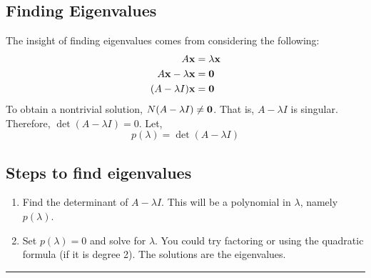 \subsection{Finding Eigenvalues}
The insight of finding eigenvalues comes from considering the following:
\begin{align*}
A {\bf x} &= \lambda {\bf x} \\
A {\bf x} - \lambda {\bf x} &= {\bf 0} \\
(A  - \lambda I) {\bf x} &= {\bf 0} \\
\end{align*}
To obtain a nontrivial solution, $N(A - \lambda I) \ne {\bf 0}$.  That is, $A-\lambda I$ is singular.  Therefore, $\det (A - \lambda I) = 0$.  Let, 
\[  p(\lambda) =   \det (A - \lambda I)  \]


\subsection*{Steps to find eigenvalues}
\begin{enumerate}
	\item Find the determinant of $A - \lambda I$.  This will be a polynomial in $\lambda$, namely $ p(\lambda)$.
	\item Set $p(\lambda) = 0$ and solve for $\lambda$.  You could try factoring or using the quadratic formula  (if it is degree 2).  The solutions are the eigenvalues.  
\end{enumerate}	

\rule[0.01in]{\textwidth}{0.0025in}

